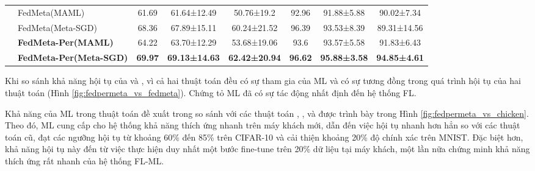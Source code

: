 \documentclass[runningheads]{llncs}
\begin{document}
\begin{table}[h]
{\begin{tabular}{c|l|ccc|ccc}
                         & FedMeta(MAML)                                                                                                      & 61.69          & 61.64±12.49          & 50.76±19.2           & 92.96                             & 91.88±5.88                        & 90.02±7.34                         \\
                         & FedMeta(Meta-SGD)                                                                                                  & 68.36          & 67.89±15.11          & 60.24±21.52          & 96.39                             & 93.53±8.39                        & 89.31±14.56                         \\
                         & \textbf{\textbf{FedMeta-Per(MAML)}}                                                                                & 64.22          & 63.70±12.29          & 53.68±19.06          & 93.6                              & 93.57±5.58                        & 91.83±6.43                         \\
                         & \textbf{\textbf{FedMeta-Per(Meta-SGD)}}                                                                            & \textbf{69.97} & \textbf{69.13±14.63} & \textbf{62.42±20.94} & \textbf{96.62}                    & \textbf{95.88±3.58}               & \textbf{94.85±4.61}                 \\
    \bottomrule
    \end{tabular}
    }
\end{table}

Khi so sánh khả năng hội tụ của  và , vì cả hai thuật toán đều có sự tham gia của ML và có sự tương đồng trong quá trình hội tụ của hai thuật toán (Hình \ref{fig:fedpermeta_vs_fedmeta}). Chứng tỏ ML đã có sự tác động nhất định đến hệ thống FL.

Khả năng của ML trong thuật toán đề xuất trong so sánh với các thuật toán , ,  và  được trình bày trong Hình \ref{fig:fedpermeta_vs_chicken}. Theo đó, ML cung cấp cho hệ thống khả năng thích ứng nhanh trên máy khách mới, dẫn đến việc  hội tụ nhanh hơn hẳn so với các thuật toán cũ, đạt các ngưỡng hội tụ từ khoảng 60\% đến 85\% trên CIFAR-10 và cải thiện khoảng 20\% độ chính xác trên MNIST. Đặc biệt hơn, khả năng hội tụ này đến từ việc thực hiện duy nhất một bước fine-tune trên 20\% dữ liệu tại máy khách, một lần nữa chứng minh khả năng thích ứng rất nhanh của hệ thống FL-ML.
\end{document}
